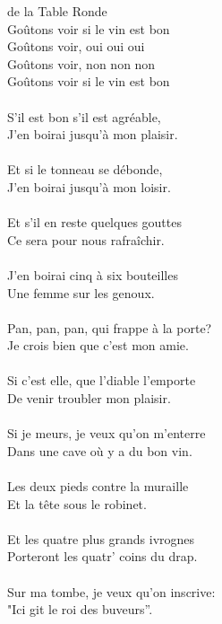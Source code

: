 
\noindent
{} de la Table Ronde
\\Goûtons voir si le vin est bon
\\Goûtons voir, oui oui oui
\\Goûtons voir, non non non
\\Goûtons voir si le vin est bon
\\\\S'il est bon s'il est agréable,
\\J'en boirai jusqu'à mon plaisir.
\\\\Et si le tonneau se débonde,
\\J'en boirai jusqu'à mon loisir.
\\\\Et s'il en reste quelques gouttes
\\Ce sera pour nous rafraîchir.
\\\\J'en boirai cinq à six bouteilles
\\Une femme sur les genoux.
\\\\Pan, pan, pan, qui frappe à la porte?
\\Je crois bien que c'est mon amie.
\\\\Si c'est elle, que l'diable l'emporte
\\De venir troubler mon plaisir.
\\\\Si je meurs, je veux qu'on m'enterre
\\Dans une cave où y a du bon vin.
\\\\Les deux pieds contre la muraille
\\Et la tête sous le robinet.
\\\\Et les quatre plus grands ivrognes
\\Porteront les quatr' coins du drap.
\\\\Sur ma tombe, je veux qu'on inscrive:
\\"Ici git le roi des buveurs”.
\breakpage